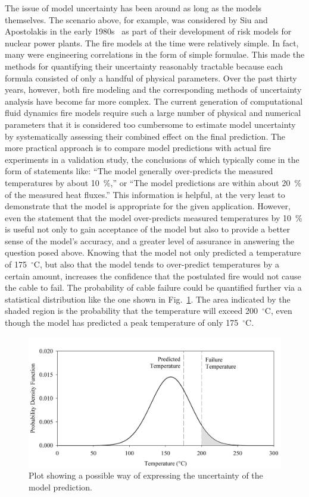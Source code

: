 The issue of model uncertainty has been around as long as the models themselves. The scenario above, for example, was considered by Siu and Apostolakis in the early 1980s~\cite{Siu:RE1982} as part of their development of risk models for nuclear power plants. The fire models at the time were relatively simple. In fact, many were engineering correlations in the form of simple formulae. This made the methods for quantifying their uncertainty reasonably tractable because each formula consisted of only a handful of physical parameters. Over the past thirty years, however, both fire modeling and the corresponding methods of uncertainty analysis have become far more complex. The current generation of computational fluid dynamics fire models require such a large number of physical and numerical parameters that it is considered too cumbersome to estimate model uncertainty by systematically assessing their combined effect on the final prediction. The more practical approach is to compare model predictions with actual fire experiments in a validation study, the conclusions of which typically come in the form of statements like: ``The model generally over-predicts the measured temperatures by about 10~\%,'' or ``The model predictions are within about 20~\% of the measured heat fluxes.'' This information is helpful, at the very least to demonstrate that the model is appropriate for the given application. However, even the statement that the model over-predicts measured temperatures by 10~\% is useful not only to gain acceptance of the model but also to provide a better sense of the model's accuracy, and a greater level of assurance in answering the question posed above. Knowing that the model not only predicted a temperature of 175~$^\circ$C, but also that the model tends to over-predict temperatures by a certain amount, increases the confidence that the postulated fire would not cause the cable to fail. The probability of cable failure could be quantified further via a statistical distribution like the one shown in Fig.~\ref{bell_curve}. The area indicated by the shaded region is the probability that the temperature will exceed 200~$^\circ$C, even though the model has predicted a peak temperature of only 175~$^\circ$C.
\begin{figure}[ht]
\begin{center}
\includegraphics[width=5.in]{FIGURES/bell_curve}
\end{center}
\caption[Demonstration of model uncertainty.]{Plot showing a possible way of expressing the uncertainty of the model prediction.}
\label{bell_curve}
\end{figure}

